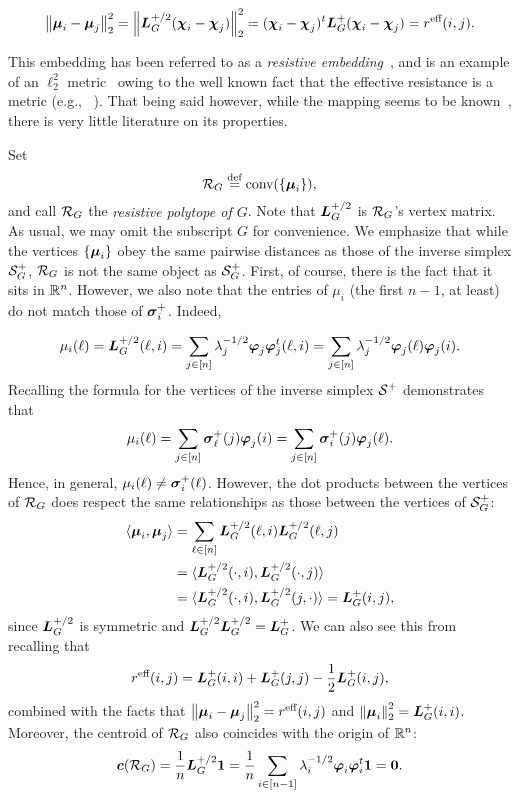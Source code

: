 \begin{equation*}
\norm{\vb*{\mu}_i-\vb*{\mu}_j}_2^2 = \norm{\vb*{L}_G^{+/2}(\boldsymbol{\chi}_i-\boldsymbol{\chi}_j)}_2^2 =  (\boldsymbol{\chi}_i-\boldsymbol{\chi}_j)^t \vb*{L}_G^+(\boldsymbol{\chi}_i-\boldsymbol{\chi}_j)=r^{\textnormal{eff}}(i,j).
\end{equation*}

This embedding has been referred to as a \emph{resistive embedding}~\cite{shayanNotes,ding2011cover}, and is an example of an $\ell_2^2$ metric~\cite{arora2009expander} owing  to the well known fact that the effective resistance is a metric (e.g., ~\cite{klein1993resistance}). That being said however, while the mapping seems to be known~\cite{ghosh2008minimizing}, there is very little literature on its properties. 

Set 
\begin{equation}
\label{eq:res_pol}
\mathcal{R}_G \overset{\text{def}}{=} \textnormal{conv}(\{\vb*{\mu}_i\}),
\end{equation}
and  call  $\mathcal{R}_G$ the \emph{resistive polytope of $G$}. Note that $\vb*{L}_G^{+/2}$ is $\mathcal{R}_G$'s vertex matrix. As usual, we may omit the subscript $G$ for convenience. We emphasize that while the vertices $\{\vb*{\mu}_i\}$ obey the same pairwise  distances as  those of the inverse simplex $\mathcal{S}_G^+$, $\mathcal{R}_G$  is not the same object as $\mathcal{S}_G^+$. First, of course, there is  the fact that it sits in  $\mathbb{R}^n$. However,  we also note that the entries of $\mu_i$ (the first $n-1$, at least) do not match those of $\vb*{\sigma}_i^+$. Indeed, 

\begin{align*}
\mu_i(\ell) = \vb*{L}_G^{+/2}(\ell,i) = \sum_{j\in[n]}\lambda_j^{-1/2}\vb*{\varphi}_j\vb*{\varphi}_j^t(\ell,i) = \sum_{j\in[n]}\lambda_j^{-1/2}\vb*{\varphi}_j(\ell)\vb*{\varphi}_j(i).
\end{align*}
Recalling the formula for the vertices of the inverse simplex $\mathcal{S}^+$ demonstrates that 
\begin{equation*}
\mu_i(\ell) = \sum_{j\in[n]}\vb*{\sigma}_\ell^+(j)\vb*{\varphi}_j(i) = \sum_{j\in[n]}\vb*{\sigma}_i^+(j)\vb*{\varphi}_j(\ell).
\end{equation*}
Hence, in general, $\mu_i(\ell)\neq \vb*{\sigma}_i^+(\ell)$. However, the dot products between the vertices of $\mathcal{R}_G$ does respect  the same relationships as those between the vertices of $\mathcal{S}_G^+$:
\begin{align*}
\langle \vb*{\mu}_i,\vb*{\mu}_j\rangle &=\sum_{\ell\in[n]} \vb*{L}_G^{+/2}(\ell,i)\vb*{L}_G^{+/2}(\ell,j) \\
&= \langle \vb*{L}_G^{+/2}(\cdot,i),\vb*{L}_G^{+/2}(\cdot,j)\rangle \\
&=\langle \vb*{L}_G^{+/2}(\cdot,i),\vb*{L}_G^{+/2}(j,\cdot)\rangle= \vb*{L}_G^+(i,j),
\end{align*}
since $\vb*{L}_G^{+/2}$ is symmetric and  $\vb*{L}_G^{+/2}\vb*{L}_G^{+/2}=\vb*{L}_G^+$.  We can also see this from recalling that 
\[r^{\textnormal{eff}}(i,j) = \vb*{L}_G^+(i,i) + \vb*{L}_G^+(j,j) - \frac{1}{2}\vb*{L}_G^+(i,j),\]
combined with the facts that $\norm{\vb*{\mu}_i-\vb*{\mu}_j}_2^2 = r^{\textnormal{eff}}(i,j)$ and $\norm{\vb*{\mu}_i}_2^2 = \vb*{L}_G^+(i,i)$. Moreover, the centroid of $\mathcal{R}_G$ also coincides with the origin  of $\mathbb{R}^n$: 
\begin{equation*}
\vb*{c}(\mathcal{R}_G) = \frac{1}{n}\vb*{L}_G^{+/2}\vb{1} = \frac{1}{n}\sum_{i\in[n-1]}\lambda_i^{-1/2}\vb*{\varphi}_i\vb*{\varphi}_i^t \vb{1} = \vb{0}.
\end{equation*}

